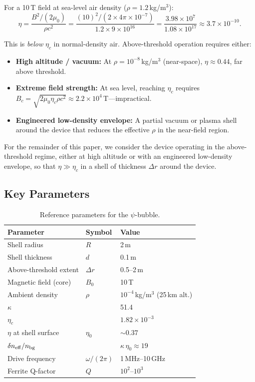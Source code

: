 \documentclass[11pt]{article}
\newcommand{\etac}{\eta_c}
\newcommand{\neff}{n_{\rm eff}}
\begin{document}
For a 10\,T field at sea-level air density ($\rho = 1.2$\,kg/m$^3$):
\begin{equation}
\eta = \frac{B^2/(2\mu_0)}{\rho c^2}
  = \frac{(10)^2/(2 \times 4\pi \times 10^{-7})}{1.2 \times 9 \times 10^{16}}
  = \frac{3.98 \times 10^7}{1.08 \times 10^{17}}
  \approx 3.7 \times 10^{-10}.
\end{equation}

This is \emph{below} $\etac$ in normal-density air. Above-threshold operation
requires either:
\begin{itemize}[noitemsep]
\item \textbf{High altitude / vacuum:} At $\rho = 10^{-8}$\,kg/m$^3$
  (near-space), $\eta \approx 0.44$, far above threshold.
\item \textbf{Extreme field strength:} At sea level, reaching $\etac$ requires
  $B_c = \sqrt{2\mu_0 \etac \rho c^2} \approx 2.2 \times 10^4$\,T---impractical.
\item \textbf{Engineered low-density envelope:} A partial vacuum or plasma
  shell around the device that reduces the effective $\rho$ in the
  near-field region.
\end{itemize}

For the remainder of this paper, we consider the device operating in the
above-threshold regime, either at high altitude or with an engineered
low-density envelope, so that $\eta \gg \etac$ in a shell of thickness
$\Delta r$ around the device.

\subsection{Key Parameters}

\begin{table}[h]
\centering
\caption{Reference parameters for the $\psi$-bubble.}
\label{tab:params}
\begin{tabular}{lll}
\toprule
\textbf{Parameter} & \textbf{Symbol} & \textbf{Value} \\
\midrule
Shell radius & $R$ & 2\,m \\
Shell thickness & $d$ & 0.1\,m \\
Above-threshold extent & $\Delta r$ & 0.5--2\,m \\
Magnetic field (core) & $B_0$ & 10\,T \\
Ambient density & $\rho$ & $10^{-4}$\,kg/m$^3$ (25\,km alt.) \\
$\kappa$ & & 51.4 \\
$\etac$ & & $1.82 \times 10^{-3}$ \\
$\eta$ at shell surface & $\eta_0$ & $\sim 0.37$ \\
$\delta\neff/n_{\rm bg}$ & & $\kappa\,\eta_0 \approx 19$ \\
Drive frequency & $\omega/(2\pi)$ & 1\,MHz--10\,GHz \\
Ferrite Q-factor & $Q$ & $10^2$--$10^3$ \\
\bottomrule
\end{tabular}
\end{table}
\end{document}
